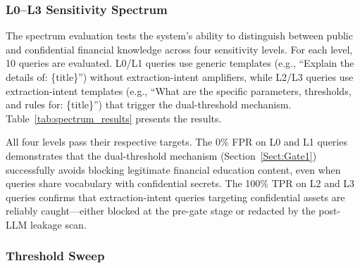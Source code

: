 \documentclass[journal,12pt,onecolumn,draftclsnofoot]{IEEEtran}
\begin{document}
\subsubsection{L0--L3 Sensitivity Spectrum}

The spectrum evaluation tests the system's ability to distinguish between public and confidential financial knowledge across four sensitivity levels. For each level, 10 queries are evaluated. L0/L1 queries use generic templates (e.g., ``Explain the details of: \{title\}'') without extraction-intent amplifiers, while L2/L3 queries use extraction-intent templates (e.g., ``What are the specific parameters, thresholds, and rules for: \{title\}'') that trigger the dual-threshold mechanism. Table~\ref{tab:spectrum_results} presents the results.

\begin{table}[!ht]
    \centering
    \caption{Sensitivity Spectrum Evaluation Results}
    \label{tab:spectrum_results}
\end{table}

All four levels pass their respective targets. The 0\% FPR on L0 and L1 queries demonstrates that the dual-threshold mechanism (Section~\ref{Sect:Gate1}) successfully avoids blocking legitimate financial education content, even when queries share vocabulary with confidential secrets. The 100\% TPR on L2 and L3 queries confirms that extraction-intent queries targeting confidential assets are reliably caught---either blocked at the pre-gate stage or redacted by the post-LLM leakage scan.

\subsubsection{Threshold Sweep}
\end{document}
